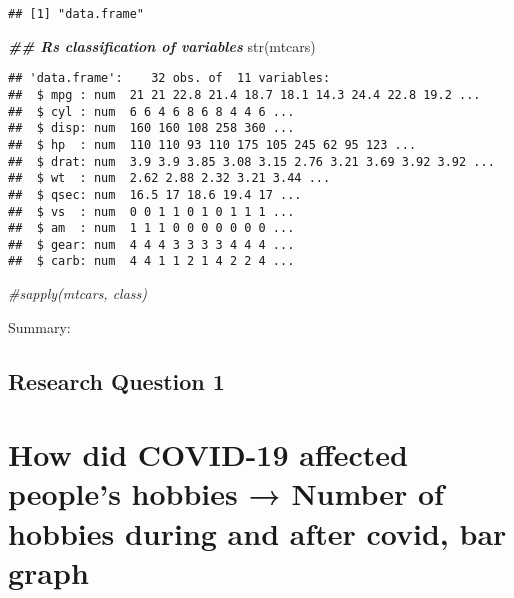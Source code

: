 \documentclass[
]{article}
\newenvironment{Shaded}{\begin{snugshade}}{\end{snugshade}}
\newcommand{\AttributeTok}[1]{\textcolor[rgb]{0.77,0.63,0.00}{#1}}
\newcommand{\CommentTok}[1]{\textcolor[rgb]{0.56,0.35,0.01}{\textit{#1}}}
\newcommand{\DocumentationTok}[1]{\textcolor[rgb]{0.56,0.35,0.01}{\textbf{\textit{#1}}}}
\newcommand{\FunctionTok}[1]{\textcolor[rgb]{0.00,0.00,0.00}{#1}}
\newcommand{\NormalTok}[1]{#1}
\newcommand{\SpecialCharTok}[1]{\textcolor[rgb]{0.00,0.00,0.00}{#1}}
\newcommand{\StringTok}[1]{\textcolor[rgb]{0.31,0.60,0.02}{#1}}
\begin{document}
\begin{verbatim}
## [1] "data.frame"
\end{verbatim}

\begin{Shaded}
\begin{Highlighting}[]
\DocumentationTok{\#\# R\textquotesingle{}s classification of variables}
\FunctionTok{str}\NormalTok{(mtcars)}
\end{Highlighting}
\end{Shaded}

\begin{verbatim}
## 'data.frame':    32 obs. of  11 variables:
##  $ mpg : num  21 21 22.8 21.4 18.7 18.1 14.3 24.4 22.8 19.2 ...
##  $ cyl : num  6 6 4 6 8 6 8 4 4 6 ...
##  $ disp: num  160 160 108 258 360 ...
##  $ hp  : num  110 110 93 110 175 105 245 62 95 123 ...
##  $ drat: num  3.9 3.9 3.85 3.08 3.15 2.76 3.21 3.69 3.92 3.92 ...
##  $ wt  : num  2.62 2.88 2.32 3.21 3.44 ...
##  $ qsec: num  16.5 17 18.6 19.4 17 ...
##  $ vs  : num  0 0 1 1 0 1 0 1 1 1 ...
##  $ am  : num  1 1 1 0 0 0 0 0 0 0 ...
##  $ gear: num  4 4 4 3 3 3 3 4 4 4 ...
##  $ carb: num  4 4 1 1 2 1 4 2 2 4 ...
\end{verbatim}

\begin{Shaded}
\begin{Highlighting}[]
\CommentTok{\#sapply(mtcars, class)}
\end{Highlighting}
\end{Shaded}

Summary:

\hypertarget{research-question-1}{%
\subsection{Research Question 1}\label{research-question-1}}

\hypertarget{how-did-covid-19-affected-peoples-hobbies-number-of-hobbies-during-and-after-covid-bar-graph}{%
\section{How did COVID-19 affected people's hobbies → Number of hobbies
during and after covid, bar
graph}\label{how-did-covid-19-affected-peoples-hobbies-number-of-hobbies-during-and-after-covid-bar-graph}}

\begin{Shaded}
\end{Shaded}
\end{document}
